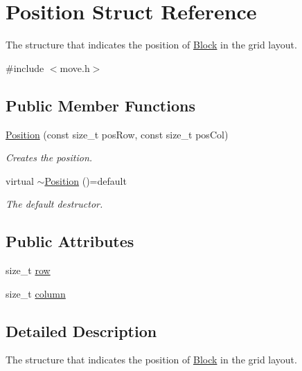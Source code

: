 \hypertarget{struct_position}{}\section{Position Struct Reference}
\label{struct_position}


The structure that indicates the position of \mbox{\hyperlink{class_block}{Block}} in the grid layout.  




{\ttfamily \#include $<$move.\+h$>$}

\subsection*{Public Member Functions}
\begin{DoxyCompactItemize}
\item 
\mbox{\hyperlink{struct_position_a5b1c9b0f98d4ba290679fcd06284a0c8}{Position}} (const size\+\_\+t pos\+Row, const size\+\_\+t pos\+Col)
\begin{DoxyCompactList}\small\item\em Creates the position. \end{DoxyCompactList}\item 
virtual \mbox{\hyperlink{struct_position_aa8917a1643d950d09a44957956aed67a}{$\sim$\+Position}} ()=default
\begin{DoxyCompactList}\small\item\em The default destructor. \end{DoxyCompactList}\end{DoxyCompactItemize}
\subsection*{Public Attributes}
\begin{DoxyCompactItemize}
\item 
size\+\_\+t \mbox{\hyperlink{struct_position_a55d3db7ca0f004461b890a5340a0cd24}{row}}
\item 
size\+\_\+t \mbox{\hyperlink{struct_position_abac43d1772ad2cf9447b134240e88d27}{column}}
\end{DoxyCompactItemize}


\subsection{Detailed Description}
The structure that indicates the position of \mbox{\hyperlink{class_block}{Block}} in the grid layout. 



